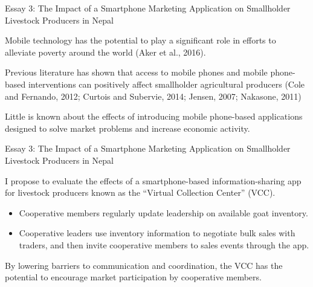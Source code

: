 \documentclass[aspectratio=169]{beamer}
\newenvironment{wideitemize}{\itemize\addtolength{\itemsep}{10pt}}{\enditemize}
\begin{document}
\begin{frame}{Essay 3: The Impact of a Smartphone Marketing Application on Smallholder Livestock Producers in Nepal}

    \begin{wideitemize}
        \item Mobile technology has the potential to play a significant role in efforts to alleviate poverty
around the world (Aker et al., 2016).
        \item Previous literature has shown that access to mobile phones and mobile phone-based interventions can positively affect smallholder agricultural producers (Cole and Fernando, 2012; Curtois and
        Subervie, 2014; Jensen, 2007; Nakasone, 2011)
        \item Little is known about the effects of introducing mobile phone-based applications designed to solve market problems and increase economic activity.
    \end{wideitemize}
\end{frame}

\begin{frame}{Essay 3: The Impact of a Smartphone Marketing Application on Smallholder Livestock Producers in Nepal}

    \begin{wideitemize}
        \item I propose to evaluate the effects of a smartphone-based information-sharing app for livestock producers known as the “Virtual Collection Center” (VCC). \vspace{.25cm}
        \begin{itemize}
            \item Cooperative members regularly update leadership on available goat inventory. \vspace{.25cm}
            \item Cooperative leaders use inventory information to negotiate bulk sales with traders, and then invite cooperative members to sales events through the app.
        \end{itemize}
        \item By lowering barriers to communication and coordination, the VCC has the potential to encourage market participation by cooperative members. 
    \end{wideitemize}
\end{frame}
\end{document}
